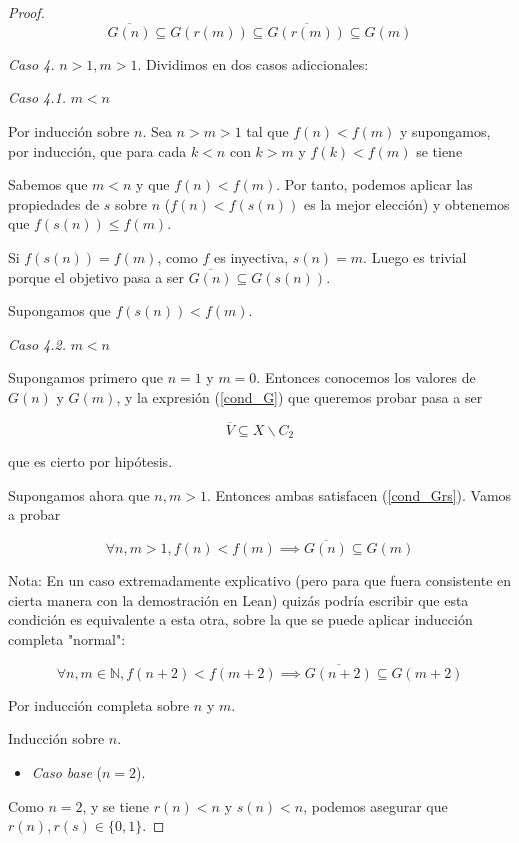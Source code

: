 \documentclass{article}
\newcommand{\nat}{\mathbb{N}}
\newcommand{\pref}[1]{(\ref{#1})}
\begin{document}
\begin{proof}
$$ \overline{G(n)} \subseteq G(r(m)) \subseteq \overline{G(r(m))} \subseteq G(m) $$

\textit{Caso 4.} $n > 1, m > 1$. Dividimos en dos casos adiccionales:

\textit{Caso 4.1.} $m < n$

Por inducción sobre $n$. Sea $n>m>1$ tal que $f(n) < f(m)$ y supongamos, por inducción, que para cada $k < n$ con $k>m$ y $f(k) < f(m)$ se tiene 

Sabemos que $m < n$ y que $f(n) < f(m)$. Por tanto, podemos aplicar las propiedades de $s$ sobre $n$ ($f(n) < f(s(n))$ es la mejor elección) y obtenemos que $f(s(n)) \leq f(m)$.

Si $f(s(n)) = f(m)$, como $f$ es inyectiva, $s(n)=m$. Luego es trivial porque el objetivo pasa a ser $\overline{G(n)} \subseteq G(s(n))$.

Supongamos que $f(s(n)) < f(m)$.

\textit{Caso 4.2.} $m < n$


Supongamos primero que $n = 1$ y $m = 0$. Entonces conocemos los valores de $G(n)$ y $G(m)$, y la expresión \pref{cond_G} que queremos probar pasa a ser

$$
  \overline{V} \subseteq X \backslash C_2
$$

que es cierto por hipótesis.

Supongamos ahora que $n, m >1$. Entonces ambas satisfacen \pref{cond_Grs}. Vamos a probar

\begin{equation} \label{cond_G_inductive}
  \forall n, m > 1, f(n) < f(m) \implies \overline{G(n)} \subseteq G(m)
\end{equation}

Nota:
En un caso extremadamente explicativo (pero para que fuera consistente en cierta manera con la demostración en Lean) quizás podría escribir que esta condición es equivalente a esta otra, sobre la que se puede aplicar inducción completa "normal":

$$
  \forall n, m \in \nat, f(n+2) < f(m+2) \implies \overline{G(n+2)} \subseteq G(m+2)
$$


Por inducción completa sobre $n$ y $m$.

Inducción sobre $n$.

\begin{itemize}
  \item \textit{Caso base} ($n = 2$).
\end{itemize}
  
Como $n=2$, y se tiene $r(n) < n$ y $s(n) < n$, podemos asegurar que $r(n), r(s) \in \{0, 1\}$.


\end{proof}
\end{document}
